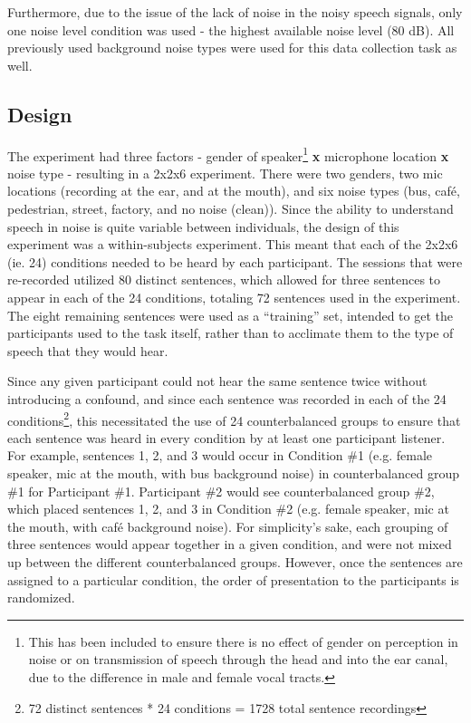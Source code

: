 \documentclass[dissertation,copyright]{uathesis}
\begin{document}
Furthermore, due to the issue of the lack of noise in the noisy speech signals, only one noise level condition was used - the highest available noise level (80 dB).  All previously used background noise types were used for this data collection task as well.


\subsection{Design}
\label{chap4:methods:design}

The experiment had three factors - gender of speaker\footnote{This has been included to ensure there is no effect of gender on perception in noise or on transmission of speech through the head and into the ear canal, due to the difference in male and female vocal tracts.} \textbf{x} microphone location \textbf{x} noise type - resulting in a 2x2x6 experiment.  There were two genders, two mic locations (recording at the ear, and at the mouth), and six noise types (bus, caf\'{e}, pedestrian, street, factory, and no noise (clean)).  Since the ability to understand speech in noise is quite variable between individuals, the design of this experiment was a within-subjects experiment.  This meant that each of the 2x2x6 (ie. 24) conditions needed to be heard by each participant.  The sessions that were re-recorded utilized 80 distinct sentences, which allowed for three sentences to appear in each of the 24 conditions, totaling 72 sentences used in the experiment.  The eight remaining sentences were used as a ``training'' set, intended to get the participants used to the task itself, rather than to acclimate them to the type of speech that they would hear.

Since any given participant could not hear the same sentence twice without introducing a confound, and since each sentence was recorded in each of the 24 conditions\footnote{72 distinct sentences * 24 conditions = 1728 total sentence recordings}, this necessitated the use of 24 counterbalanced groups to ensure that each sentence was heard in every condition by at least one participant listener.  For example, sentences 1, 2, and 3 would occur in Condition \#1 (e.g. female speaker, mic at the mouth, with bus background noise) in counterbalanced group \#1 for Participant \#1. Participant \#2 would see counterbalanced group \#2, which placed sentences 1, 2, and 3 in Condition \#2 (e.g. female speaker, mic at the mouth, with caf\'{e} background noise).  For simplicity's sake, each grouping of three sentences would appear together in a given condition, and were not mixed up between the different counterbalanced groups.  However, once the sentences are assigned to a particular condition, the order of presentation to the participants is randomized.
\end{document}

